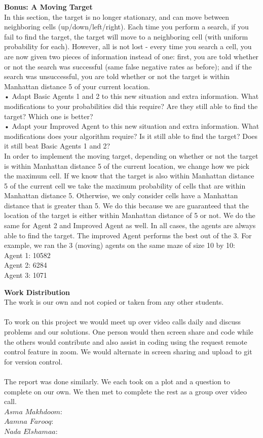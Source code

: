 \documentclass{article}
\theoremstyle{definition}
\begin{document}
\textbf{Bonus: A Moving Target} \\
In this section, the target is no longer stationary, and can move between neighboring cells (up/down/left/right). Each time you perform a search, if you fail to find the target, the target will move to a neighboring cell (with uniform probability for each). However, all is not lost - every time you search a cell, you are now given two pieces of information instead of one: first, you are told whether or not the search was successful (same false negative rates as before); and if the search was unsuccessful, you are told whether or not the target is within Manhattan distance 5 of your current location. \\
• Adapt Basic Agents 1 and 2 to this new situation and extra information. What modifications to your probabilities did this require? Are they still able to find the target? Which one is better?\\
• Adapt your Improved Agent to this new situation and extra information. What modifications does your algorithm require? Is it still able to find the target? Does it still beat Basic Agents 1 and 2? \\

In order to implement the moving target, depending on whether or not the target is within Manhattan distance 5 of the current location, we change how we pick the maximum cell. If we know that the target is also within Manhattan distance 5 of the current cell we take the maximum probability of cells that are within Manhattan distance 5. Otherwise, we only consider cells have a Manhattan distance that is greater than 5. We do this because we are guaranteed that the location of the target is either within Manhattan distance of 5 or not. We do the same for Agent 2 and Improved Agent as well. In all cases, the agents are always able to find the target. The improved Agent performs the best out of the 3. For example, we ran the 3 (moving) agents on the same maze of size 10 by 10: \\
Agent 1: 10582 \\
Agent 2: 6284 \\
Agent 3: 1071 \\

\smallskip

\textbf{Work Distribution}
\\
The work is our own and not copied or taken from any other students. 
\\\\
To work on this project we would meet up over video calls daily and discuss problems and our solutions. One person would then screen share and code while the others would contribute and also assist in coding using the request remote control feature in zoom. We would alternate in screen sharing and upload to git for version control. 
\\\\
The report was done similarly. We each took on a plot and a question to complete on our own. We then met to complete the rest as a group over video call. 
\\
$Asma$ $Makhdoom:$ 
\\
$Aamna$ $Farooq:$ 
\\
$Nada$ $Elshamaa:$ 
\\
\smallskip
\end{document}
